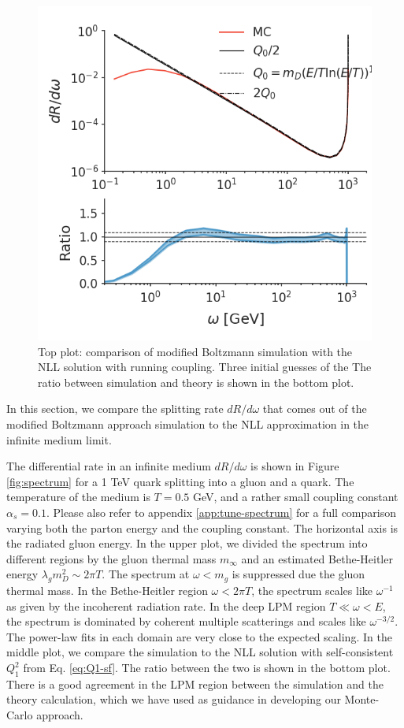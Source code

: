 \documentclass[aps, prc, reprint, amsmath, groupedaddress, nofootinbib]{revtex4-1}
\begin{document}
\begin{figure}
\includegraphics[width=\columnwidth]{running.png}
\caption{Top plot: comparison of modified Boltzmann simulation with the NLL solution  with running coupling.
Three initial guesses of the 
The ratio between simulation and theory is shown in the bottom plot.}
\label{fig:running}
\end{figure}

In this section, we compare the splitting rate $dR/d\omega$ that comes out of the modified Boltzmann approach simulation to the NLL approximation in the infinite medium limit.

The differential rate in an infinite medium $dR/d\omega$ is shown in Figure \ref{fig:spectrum} for a 1 TeV quark splitting into a gluon and a quark.
The temperature of the medium is $T=0.5$ GeV, and a rather small coupling constant $\alpha_s = 0.1$.
Please also refer to appendix \ref{app:tune-spectrum} for a full comparison varying both the parton energy and the coupling constant.
The horizontal axis is the radiated gluon energy.
In the upper plot, we divided the spectrum into different regions by the gluon thermal mass $m_\infty$ and an estimated Bethe-Heitler energy $\lambda_g m_D^2 \sim 2\pi T$.
The spectrum at $\omega < m_g$ is suppressed due the gluon thermal mass.
In the Bethe-Heitler region $\omega < 2\pi T$, the spectrum scales like $\omega^{-1}$ as given by the incoherent radiation rate.
In the deep LPM region $T \ll \omega < E$, the spectrum is dominated by coherent multiple scatterings and scales like $\omega^{-3/2}$.
The power-law fits in each domain are very close to the expected scaling.
In the middle plot, we compare the simulation to the NLL solution with self-consistent $Q_1^2$ from Eq. \ref{eq:Q1-sf}. 
The ratio between the two is shown in the bottom plot.
There is a good agreement in the LPM region between the simulation and the theory calculation, which we have used as guidance in developing our Monte-Carlo approach.
\end{document}
